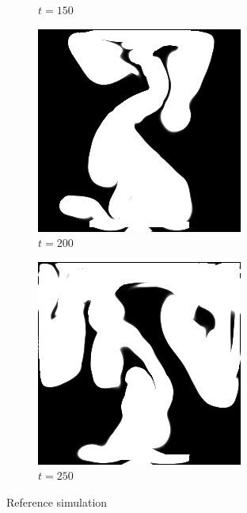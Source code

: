 \documentclass[a4paper,12pt,twoside]{report}
\begin{document}
\begin{figure}
\begin{subfigure}{0.18\textwidth}
  \caption{$t=150$}
\end{subfigure}
\begin{subfigure}{0.18\textwidth}
  \centering
  \includegraphics[scale=0.28]{buoyancy_test/dens_000200_ref.png}
  \caption{$t=200$}
\end{subfigure}
\begin{subfigure}{0.18\textwidth}
  \centering
  \includegraphics[scale=0.28]{buoyancy_test/dens_000249_ref.png}
  \caption{$t=250$}
\end{subfigure}
\caption{Reference simulation}
\label{sol buoyancy high ref}
\end{figure}
\end{document}
